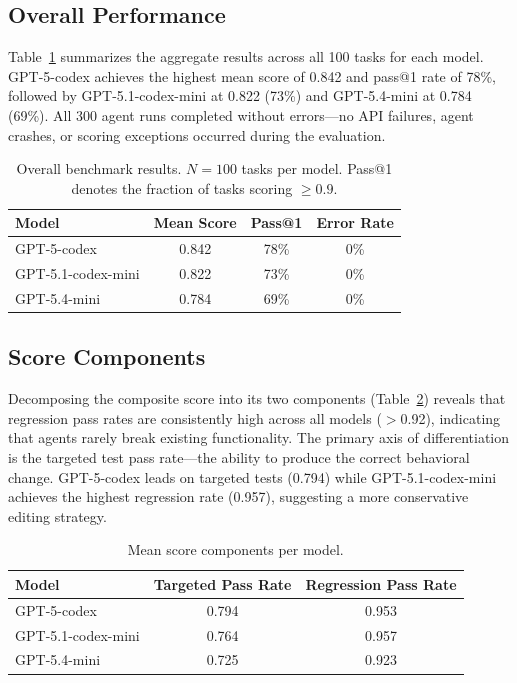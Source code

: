 \documentclass[10pt]{article}
\begin{document}
\subsection{Overall Performance}

Table~\ref{tab:overall} summarizes the aggregate results across all 100 tasks for each model. GPT-5-codex achieves the highest mean score of 0.842 and pass@1 rate of 78\%, followed by GPT-5.1-codex-mini at 0.822 (73\%) and GPT-5.4-mini at 0.784 (69\%). All 300 agent runs completed without errors---no API failures, agent crashes, or scoring exceptions occurred during the evaluation.

\begin{table}[ht]
\centering
\begin{tabular}{lccc}
\toprule
\textbf{Model} & \textbf{Mean Score} & \textbf{Pass@1} & \textbf{Error Rate} \\
\midrule
GPT-5-codex & 0.842 & 78\% & 0\% \\
GPT-5.1-codex-mini & 0.822 & 73\% & 0\% \\
GPT-5.4-mini & 0.784 & 69\% & 0\% \\
\bottomrule
\end{tabular}
\caption{Overall benchmark results. $N=100$ tasks per model. Pass@1 denotes the fraction of tasks scoring $\geq 0.9$.}
\label{tab:overall}
\end{table}

\subsection{Score Components}

Decomposing the composite score into its two components (Table~\ref{tab:components}) reveals that regression pass rates are consistently high across all models ($>$0.92), indicating that agents rarely break existing functionality. The primary axis of differentiation is the targeted test pass rate---the ability to produce the correct behavioral change. GPT-5-codex leads on targeted tests (0.794) while GPT-5.1-codex-mini achieves the highest regression rate (0.957), suggesting a more conservative editing strategy.

\begin{table}[ht]
\centering
\begin{tabular}{lcc}
\toprule
\textbf{Model} & \textbf{Targeted Pass Rate} & \textbf{Regression Pass Rate} \\
\midrule
GPT-5-codex & 0.794 & 0.953 \\
GPT-5.1-codex-mini & 0.764 & 0.957 \\
GPT-5.4-mini & 0.725 & 0.923 \\
\bottomrule
\end{tabular}
\caption{Mean score components per model.}
\label{tab:components}
\end{table}
\end{document}
